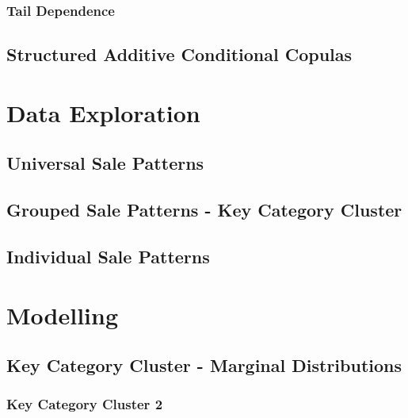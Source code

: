 \documentclass[11pt, twoside]{article}
\numberwithin{equation}{section}
\numberwithin{table}{section}
\numberwithin{figure}{section}
\begin{document}
\subsubsection{Tail Dependence} \label{sssec:tail_dependence}

\subsection{Structured Additive Conditional Copulas} \label{ssec:conditional_copulas}

%
\newpage


\thispagestyle{plain}
\section{Data Exploration} \label{sec:data_exploration}

\subsection{Universal Sale Patterns} \label{ssec:universal_patterns}

\subsection{Grouped Sale Patterns - Key Category Cluster} \label{ssec:grouped_patterns}

\subsection{Individual Sale Patterns} \label{ssec:individual_patterns}

\newpage

\thispagestyle{plain}
\section{Modelling} \label{sec:modelling}

\subsection{Key Category Cluster - Marginal Distributions} \label{ssec:kcc_margins}

\subsubsection{Key Category Cluster 2} \label{sssec:margin_kcc_2}

\end{document}
